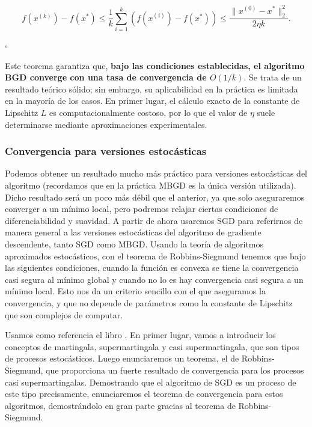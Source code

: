 $$f(x^{(k)}) - f(x^*) \leq \frac{1}{k} \sum ^k _{i=1} \left ( f(x^{(i)}) - f(x^*) \right ) \leq \frac{\|x^{(0)}-x^* \|^2_2}{2\eta k} .$$


\begin{flushright}
    $\square$
\end{flushright} 


Este teorema garantiza que, \textbf{bajo las condiciones establecidas, el algoritmo BGD converge con una tasa de convergencia de $O(1/k)$}. Se trata de un resultado teórico sólido; sin embargo, su aplicabilidad en la práctica es limitada en la mayoría de los casos. En primer lugar, el cálculo exacto de la constante de Lipschitz $L$ es computacionalmente costoso, por lo que el valor de $\eta$ suele determinarse mediante aproximaciones experimentales.



\subsubsection{Convergencia para versiones estocásticas}


Podemos obtener un resultado mucho más práctico para versiones estocásticas del algoritmo (recordamos que en la práctica MBGD es la única versión utilizada). Dicho resultado será un poco más débil que el anterior, ya que solo aseguraremos converger a un mínimo local, pero podremos relajar ciertas condiciones de diferenciabilidad y suavidad. A partir de ahora usaremos SGD para referirnos de manera general a las versiones estocásticas del algoritmo de gradiente descendente, tanto SGD como MBGD. Usando la teoría de algoritmos aproximados estocásticos, con el teorema de Robbins-Siegmund tenemos que bajo las siguientes condiciones, cuando la función es convexa se tiene la convergencia casi segura al mínimo global y cuando no lo es hay convergencia casi segura a un mínimo local. Esto nos da un criterio sencillo con el que aseguramos la convergencia, y que no depende de parámetros como la constante de Lipschitz que son complejos de computar.

Usamos como referencia el libro \cite{stochastic}. En primer lugar, vamos a introducir los conceptos de martingala, supermartingala y casi supermartingala, que son tipos de procesos estocásticos. Luego enunciaremos un teorema, el de Robbins-Siegmund, que proporciona un fuerte resultado de convergencia para los procesos casi supermartingalas. Demostrando que el algoritmo de SGD es un proceso de este tipo precisamente, enunciaremos el teorema de convergencia para estos algoritmos, demostrándolo en gran parte gracias al teorema de Robbins-Siegmund.





